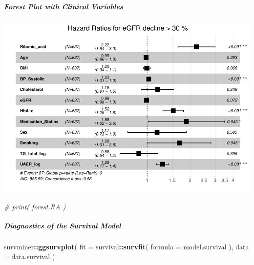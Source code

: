 \documentclass[]{article}
\newenvironment{Shaded}{\begin{snugshade}}{\end{snugshade}}
\newcommand{\CommentTok}[1]{\textcolor[rgb]{0.56,0.35,0.01}{\textit{#1}}}
\newcommand{\DataTypeTok}[1]{\textcolor[rgb]{0.13,0.29,0.53}{#1}}
\newcommand{\KeywordTok}[1]{\textcolor[rgb]{0.13,0.29,0.53}{\textbf{#1}}}
\newcommand{\NormalTok}[1]{#1}
\newcommand{\OperatorTok}[1]{\textcolor[rgb]{0.81,0.36,0.00}{\textbf{#1}}}
\newcommand{\StringTok}[1]{\textcolor[rgb]{0.31,0.60,0.02}{#1}}
\let\oldsubparagraph\subparagraph
\renewcommand{\subparagraph}[1]{\oldsubparagraph{#1}\mbox{}}
\begin{document}
\newpage

\hypertarget{forest-plot-with-clinical-variables}{%
\subparagraph{Forest Plot with Clinical
Variables}\label{forest-plot-with-clinical-variables}}

\begin{Shaded}
\end{Shaded}

\includegraphics{0033_PROFIL--Metabolomics_files/figure-latex/RA-Mortality-Adjusted-Forest-1.pdf}

\begin{Shaded}
\begin{Highlighting}[]
\CommentTok{# print( forest.RA )}
\end{Highlighting}
\end{Shaded}

\newpage

\hypertarget{diagnostics-of-the-survival-model}{%
\subparagraph{Diagnostics of the Survival
Model}\label{diagnostics-of-the-survival-model}}

\begin{Shaded}
\begin{Highlighting}[]
\NormalTok{survminer}\OperatorTok{::}\KeywordTok{ggsurvplot}\NormalTok{( }
  \DataTypeTok{fit =}\NormalTok{ survival}\OperatorTok{::}\KeywordTok{survfit}\NormalTok{( }\DataTypeTok{formula =}\NormalTok{ model.survival ), }
  \DataTypeTok{data =}\NormalTok{ data.survival}
\NormalTok{)}
\end{Highlighting}
\end{Shaded}
\end{document}
